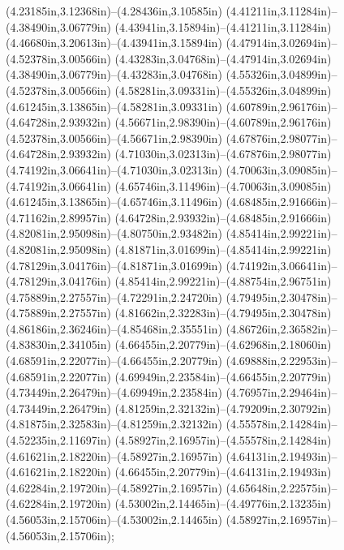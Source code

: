 (4.23185in,3.12368in)--(4.28436in,3.10585in) (4.41211in,3.11284in)--(4.38490in,3.06779in) (4.43941in,3.15894in)--(4.41211in,3.11284in) (4.46680in,3.20613in)--(4.43941in,3.15894in) (4.47914in,3.02694in)--(4.52378in,3.00566in) (4.43283in,3.04768in)--(4.47914in,3.02694in) (4.38490in,3.06779in)--(4.43283in,3.04768in) (4.55326in,3.04899in)--(4.52378in,3.00566in) (4.58281in,3.09331in)--(4.55326in,3.04899in) (4.61245in,3.13865in)--(4.58281in,3.09331in) (4.60789in,2.96176in)--(4.64728in,2.93932in) (4.56671in,2.98390in)--(4.60789in,2.96176in) (4.52378in,3.00566in)--(4.56671in,2.98390in) (4.67876in,2.98077in)--(4.64728in,2.93932in) (4.71030in,3.02313in)--(4.67876in,2.98077in) (4.74192in,3.06641in)--(4.71030in,3.02313in) (4.70063in,3.09085in)--(4.74192in,3.06641in) (4.65746in,3.11496in)--(4.70063in,3.09085in) (4.61245in,3.13865in)--(4.65746in,3.11496in) (4.68485in,2.91666in)--(4.71162in,2.89957in) (4.64728in,2.93932in)--(4.68485in,2.91666in) (4.82081in,2.95098in)--(4.80750in,2.93482in) (4.85414in,2.99221in)--(4.82081in,2.95098in) (4.81871in,3.01699in)--(4.85414in,2.99221in) (4.78129in,3.04176in)--(4.81871in,3.01699in) (4.74192in,3.06641in)--(4.78129in,3.04176in) (4.85414in,2.99221in)--(4.88754in,2.96751in) (4.75889in,2.27557in)--(4.72291in,2.24720in) (4.79495in,2.30478in)--(4.75889in,2.27557in) (4.81662in,2.32283in)--(4.79495in,2.30478in) (4.86186in,2.36246in)--(4.85468in,2.35551in) (4.86726in,2.36582in)--(4.83830in,2.34105in) (4.66455in,2.20779in)--(4.62968in,2.18060in) (4.68591in,2.22077in)--(4.66455in,2.20779in) (4.69888in,2.22953in)--(4.68591in,2.22077in) (4.69949in,2.23584in)--(4.66455in,2.20779in) (4.73449in,2.26479in)--(4.69949in,2.23584in) (4.76957in,2.29464in)--(4.73449in,2.26479in) (4.81259in,2.32132in)--(4.79209in,2.30792in) (4.81875in,2.32583in)--(4.81259in,2.32132in) (4.55578in,2.14284in)--(4.52235in,2.11697in) (4.58927in,2.16957in)--(4.55578in,2.14284in) (4.61621in,2.18220in)--(4.58927in,2.16957in) (4.64131in,2.19493in)--(4.61621in,2.18220in) (4.66455in,2.20779in)--(4.64131in,2.19493in) (4.62284in,2.19720in)--(4.58927in,2.16957in) (4.65648in,2.22575in)--(4.62284in,2.19720in) (4.53002in,2.14465in)--(4.49776in,2.13235in) (4.56053in,2.15706in)--(4.53002in,2.14465in) (4.58927in,2.16957in)--(4.56053in,2.15706in);
